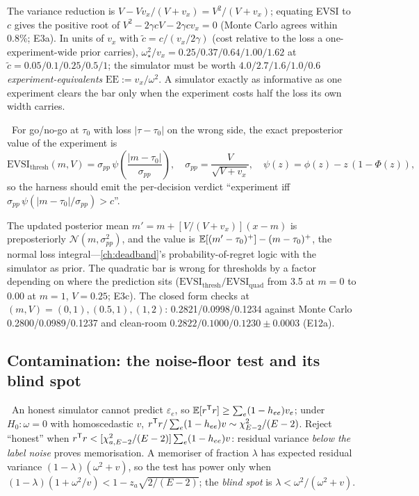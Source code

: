 The variance reduction is $V - Vv_x/(V + v_x) = V^2/(V + v_x)$; equating EVSI to $c$ gives the positive root of $V^2 - 2\gamma cV - 2\gamma cv_x = 0$ (Monte Carlo agrees within 0.8\%; E3a). In units of $v_x$ with $\tilde c = c/(v_x/2\gamma)$ (cost relative to the loss a one-experiment-wide prior carries), $\omega_\star^2/v_x = 0.25/0.37/0.64/1.00/1.62$ at $\tilde c = 0.05/0.1/0.25/0.5/1$; the simulator must be worth $4.0/2.7/1.6/1.0/0.6$ \emph{experiment-equivalents} $\mathrm{EE} := v_x/\omega^2$. A simulator exactly as informative as one experiment clears the bar only when the experiment costs half the loss its own width carries.

\begin{proposition}
\label{sim:prop:threshold}
\tagEstablished\ For go/no-go at $\tau_0$ with loss $|\tau - \tau_0|$ on the wrong side, the exact preposterior value of the experiment is
\begin{equation}
\mathrm{EVSI}_{\mathrm{thresh}}(m, V) = \sigma_{pp}\,\psi\!\left(\frac{|m - \tau_0|}{\sigma_{pp}}\right), \quad \sigma_{pp} = \frac{V}{\sqrt{V + v_x}}, \quad \psi(z) = \phi(z) - z\,(1 - \Phi(z)),
\label{sim:eq:evsithresh}
\end{equation}
so the harness should emit the per-decision verdict ``experiment iff $\sigma_{pp}\,\psi(|m - \tau_0|/\sigma_{pp}) > c$''.
\end{proposition}

The updated posterior mean $m' = m + [V/(V + v_x)](x - m)$ is preposteriorly $\mathcal N(m, \sigma_{pp}^2)$, and the value is $\mathbb{E}[(m' - \tau_0)^+] - (m - \tau_0)^+$, the normal loss integral---\cref{ch:deadband}'s probability-of-regret logic with the simulator as prior. The quadratic bar is wrong for thresholds by a factor depending on where the prediction sits ($\mathrm{EVSI}_{\mathrm{thresh}}/\mathrm{EVSI}_{\mathrm{quad}}$ from 3.5 at $m = 0$ to 0.00 at $m = 1$, $V = 0.25$; E3c). The closed form checks at $(m, V) = (0, 1), (0.5, 1), (1, 2)$: 0.2821/0.0998/0.1234 against Monte Carlo 0.2800/0.0989/0.1237 and clean-room $0.2822/0.1000/0.1230 \pm 0.0003$ (E12a).

\subsection{Contamination: the noise-floor test and its blind spot}

\begin{proposition}
\label{sim:prop:floor}
\tagEstablished\ An honest simulator cannot predict $\varepsilon_e$, so $\mathbb{E}[r^{\mathsf{T}} r] \ge \sum_e(1 - h_{ee})v_e$; under $H_0 : \omega = 0$ with homoscedastic $v$, $r^{\mathsf{T}} r/\sum_e(1 - h_{ee})v \sim \chi^2_{E-2}/(E-2)$. Reject ``honest'' when $r^{\mathsf{T}} r < [\chi^2_{a,E-2}/(E-2)]\sum_e(1 - h_{ee})v$: residual variance \emph{below the label noise} proves memorisation. A memoriser of fraction $\lambda$ has expected residual variance $(1 - \lambda)(\omega^2 + v)$, so the test has power only when $(1 - \lambda)(1 + \omega^2/v) < 1 - z_a\sqrt{2/(E-2)}$; the \emph{blind spot} is $\lambda < \omega^2/(\omega^2 + v)$.
\end{proposition}

